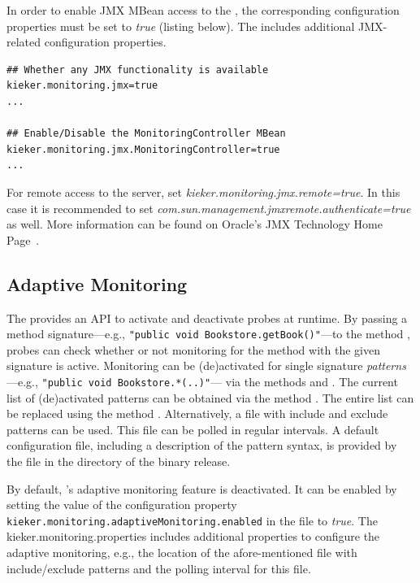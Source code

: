 In order to enable JMX MBean access to the , the corresponding configuration properties must be set to \textit{true} (listing below). %
The \file{\monitoringPropertiesFile} includes additional JMX-related configuration properties. \\

\setPropertiesListing
\begin{lstlisting}
## Whether any JMX functionality is available
kieker.monitoring.jmx=true
...

## Enable/Disable the MonitoringController MBean
kieker.monitoring.jmx.MonitoringController=true
...
\end{lstlisting}

For remote access to the server, set \textit{kieker.monitoring.jmx.remote=true}. In this case it is recommended to set \textit{com.sun.management.jmxremote.authenticate=true} as well. More information can be found on Oracle's JMX Technology Home Page~\cite{JMX-Website}.

\subsection{Adaptive Monitoring}

The  provides an API to activate and deactivate %
probes at runtime. By passing a method signature---e.g., %
\texttt{"public void Bookstore.getBook()"}---to the method %
, probes can check whether or not monitoring for the %
method with the given signature is active. %
Monitoring can be (de)activated for single signature \textit{patterns}---e.g., %
\texttt{"public void Bookstore.*(..)"}--- via the methods %
 and . The current list of %
(de)activated patterns can be obtained via the method . %
The entire list can be replaced using the method . %
Alternatively, a file with include and exclude patterns can be used. This file %
can be polled in regular intervals. %
A default configuration file, including a description of the pattern syntax, is provided %
by the file  in the %
 directory of the binary release. %

By default, \Kieker{}'s adaptive monitoring feature is deactivated. It can be %
enabled by setting the value of the configuration property %
\lstinline{kieker.monitoring.adaptiveMonitoring.enabled} %
in the \file{\monitoringPropertiesFile} file to \textit{true}. The %
kieker.monitoring.properties includes additional properties to configure the %
adaptive monitoring, e.g., the location of the afore-mentioned file with %
include/exclude patterns and the polling interval for this file. 

